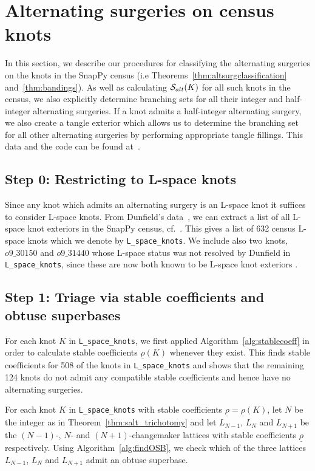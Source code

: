 \documentclass{amsart} %
\newcommand{\Salt}{\mathcal{S}_{\rm alt}}
\theoremstyle{thm}
\theoremstyle{definition}
\numberwithin{equation}{section}
\begin{document}
\section{Alternating surgeries on census knots} \label{sec:census}
In this section, we describe our procedures for classifying the alternating surgeries on the knots in the SnapPy census (i.e Theorems~\ref{thm:altsurgclassification} and~\ref{thm:bandings}). As well as calculating $\Salt(K)$ for all such knots in the census, we also explicitly determine branching sets for all their integer and half-integer alternating surgeries. If a knot admits a half-integer alternating surgery, we also create a tangle exterior which allows us to
determine the branching set for all other alternating surgeries by performing appropriate tangle fillings. This data and the code can be found at~\cite{BKM}.

\subsection*{Step 0: Restricting to L-space knots}
Since any knot which admits an alternating surgery is an L-space knot it suffices to consider L-space knots. From Dunfield's data~\cite{Du19}, we can extract a list of all L-space knot exteriors in the SnapPy census, cf.~\cite{ABG+19}. This gives a list of 632 census L-space knots which we denote by \verb|L_space_knots|. We include also two knots, $o9\_30150$ and $o9\_31440$ whose L-space status was not resolved by Dunfield in \verb|L_space_knots|, since these are now both known to be L-space knot exteriors \cite{quasi_alt_slopes}.

\subsection*{Step 1: Triage via stable coefficients and obtuse superbases}
For each knot $K$ in \verb|L_space_knots|, we first applied Algorithm~\ref{alg:stablecoeff} in order to calculate stable coefficients $\underline{\rho}(K)$ whenever they exist. This finds stable coefficients for 508 of the knots in \verb|L_space_knots| and shows that the remaining 124 knots do not admit any compatible stable coefficients and hence have no alternating surgeries.

For each knot $K$ in \verb|L_space_knots| with stable coefficients $\underline{\rho}=\underline{\rho}(K)$, let $N$ be the integer as in Theorem~\ref{thm:salt_trichotomy} and let $L_{N-1}$, $L_{N}$ and $L_{N+1}$ be the $(N-1)$-, $N$- and $(N+1)$-changemaker lattices with stable coefficients $\underline{\rho}$ respectively. Using Algorithm~\ref{alg:findOSB}, we check which of the three lattices $L_{N-1}$, $L_{N}$ and $L_{N+1}$ admit an obtuse superbase.
\end{document}
